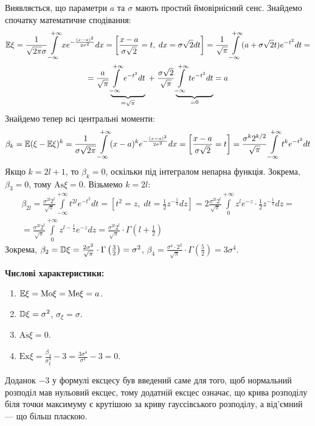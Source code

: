 Виявляється, що параметри $a$ та $\sigma$ мають простий ймовірнісний сенс.
Знайдемо спочатку математичне сподівання:
\begin{gather*}
    \mathbb{E}\xi = 
    \frac{1}{\sqrt{2\pi}\sigma}
    \int\limits_{-\infty}^{+\infty}x e^{-\frac{(x-a)^2}{2\sigma^2}} dx 
    = \left[ \frac{x-a}{\sigma \sqrt{2}} = t, \; dx = \sigma\sqrt{2}dt \right] = 
    \frac{1}{\sqrt{\pi}}\int\limits_{-\infty}^{+\infty} 
    (a + \sigma\sqrt{2}t)e^{-t^2} dt = \\
    =\frac{a}{\sqrt{\pi}}
    \underbrace{\int\limits_{-\infty}^{+\infty}e^{-t^2}dt}_{ = \sqrt{\pi}} \; + \; 
    \frac{\sigma \sqrt{2}}{\sqrt{\pi}} 
    \underbrace{\int\limits_{-\infty}^{+\infty} t e^{-t^2}dt}_{= 0}
    = a
\end{gather*}
Знайдемо тепер всі центральні моменти:
\begin{gather*}
    \beta_k = \mathbb{E}(\xi - \mathbb{E}\xi)^k = 
    \frac{1}{\sigma\sqrt{2\pi}}
    \int\limits_{-\infty}^{+\infty}(x-a)^k 
    e^{-\frac{(x-a)^2}{2\sigma^2}} dx = 
    \left[ \frac{x-a}{\sigma \sqrt{2}} = t\right] 
    =
    \frac{\sigma^k 2^{k/2}}{\sqrt{\pi}}
    \int\limits_{-\infty}^{+\infty}t^k 
    e^{-t^2} dt
\end{gather*}
Якщо $k = 2l + 1$, то $\beta_k = 0$, оскільки під інтегралом непарна функція.
Зокрема, $\beta_3 = 0$, тому $\mathrm{As}\xi = 0$.
Візьмемо $k = 2l$:
\begin{gather*}
    \beta_{2l} = 
    \frac{\sigma^{2l} 2^{l}}{\sqrt{\pi}}
    \int\limits_{-\infty}^{+\infty}t^{2l} 
    e^{-t^2} dt = \left[ t^2 = z, \; dt = \frac{1}{2} z^{-\frac{1}{2}}dz\right] = 
    2\frac{\sigma^{2l}2^l}{\sqrt{\pi}}
    \int\limits_{0}^{+\infty}z^l e^{-z}\cdot \frac{1}{2} z^{-\frac{1}{2}}
    dz = \\
    = \frac{\sigma^{2l}2^l}{\sqrt{\pi}}
    \int\limits_{0}^{+\infty}z^{l-\frac{1}{2}} e^{-z}
    dz = 
    \frac{\sigma^{2l}2^l}{\sqrt{\pi}}\cdot\Gamma\left(l+\frac{1}{2}\right)
\end{gather*}
Зокрема, $\beta_2 = \mathbb{D}\xi = \frac{2 \sigma^2}{\sqrt{\pi}}\cdot\Gamma\left(\frac{3}{2}\right) = \sigma^2$,
$\beta_4 = \frac{\sigma^4\cdot2^2}{\sqrt{\pi}}\cdot \Gamma\left(\frac{5}{2}\right) = 3\sigma^4$.

\noindent \textbf{Числові характеристики:}
\begin{enumerate}
    \item $\mathbb{E}\xi = \mathrm{Mo}\xi = \mathrm{Me}\xi = a$.
    \item $\mathbb{D}\xi = \sigma^2$, $\sigma_\xi = \sigma$.
    \item $\mathrm{As}\xi = 0$.
    \item $\mathrm{Ex}\xi = \frac{\beta_4}{\sigma_\xi^4} - 3 = 
    \frac{3\sigma^4}{\sigma^4} - 3 = 0$. 
\end{enumerate}
\begin{remark}
    Доданок $-3$ у формулі ексцесу був введений саме для того, щоб нормальний розподіл мав нульовий ексцес,
    тому додатній ексцес означає, що крива розподілу біля точки максимуму є крутішою за криву гауссівського розподілу,
    а від'ємний --- що більш пласкою.
\end{remark}

